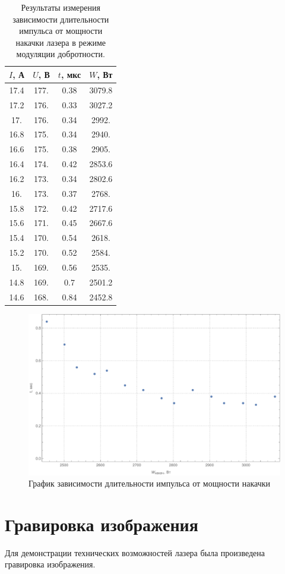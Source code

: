 \documentclass[a4paper, 12pt]{article}
\begin{document}
\begin{table}[!htb]
	\centering
	\caption{Результаты измерения зависимости длительности импульса от мощности накачки лазера в режиме модуляции добротности.}
	\begin{tabular}{|c|c|c|c|}
		\hline
		$I$, А & $U$, В & $t$, мкс & $W$, Вт\\
		\hline
		17.4 & 177. & 0.38 & 3079.8 \\
 17.2 & 176. & 0.33 & 3027.2 \\
 17. & 176. & 0.34 & 2992. \\
 16.8 & 175. & 0.34 & 2940. \\
 16.6 & 175. & 0.38 & 2905. \\
 16.4 & 174. & 0.42 & 2853.6 \\
 16.2 & 173. & 0.34 & 2802.6 \\
 16. & 173. & 0.37 & 2768. \\
 15.8 & 172. & 0.42 & 2717.6 \\
 15.6 & 171. & 0.45 & 2667.6 \\
 15.4 & 170. & 0.54 & 2618. \\
 15.2 & 170. & 0.52 & 2584. \\
 15. & 169. & 0.56 & 2535. \\
 14.8 & 169. & 0.7 & 2501.2 \\
 14.6 & 168. & 0.84 & 2452.8 \\
 \hline
	\end{tabular}
\end{table}
\begin{figure}[!htb]
	\centering
	\includegraphics[width=\textwidth]{3.pdf}
	\caption{График зависимости длительности импульса от мощности накачки}
\end{figure}
\section{Гравировка изображения}
Для демонстрации технических возможностей лазера была произведена гравировка изображения.
\end{document}
